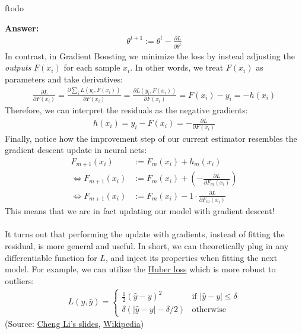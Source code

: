 ƒtodo\documentclass{article}
\newenvironment{QandA}{\begin{enumerate}[label=\arabic*.]}{\end{enumerate}}
\newenvironment{InnerQandA}{\begin{enumerate}[label=\roman*.]}{\end{enumerate}}
\newenvironment{answer}{\par\normalfont \textbf{Answer:}}{}
\begin{document}
\begin{QandA}
\begin{InnerQandA}
\begin{answer}
            \begin{align*}
                \theta^{t+1} := \theta^t - \frac{\partial L}{\partial \theta^t}
            \end{align*}
            In contrast, in Gradient Boosting we minimize the loss by instead adjusting the \textit{outputs} $F(x_i)$ for each sample $x_i$. In other words, we treat $F(x_i)$ as parameters and take derivatives:
            \begin{align*}
                \frac{\partial L}{\partial F(x_i)} = \frac{\partial \sum_i L(y_i, F(x_i))}{\partial F(x_i)} = \frac{\partial L(y_i, F(x_i))}{\partial F(x_i)} = F(x_i) - y_i = - h(x_i)
            \end{align*}
            Therefore, we can interpret the residuals as the negative gradients:
            \begin{align*}
                h(x_i) = y_i - F(x_i) = - \frac{\partial L}{\partial F(x_i)}
            \end{align*}
            Finally, notice how the improvement step of our current estimator resembles the gradient descent update in neural nets:
            \begin{align*}
                F_{m+1}(x_i) &:= F_m(x_i) + h_m(x_i) \\
                \Leftrightarrow F_{m+1}(x_i) &:= F_m(x_i) + (-\frac{\partial L}{\partial F_m(x_i)}) \\
                \Leftrightarrow F_{m+1}(x_i) &:= F_m(x_i) 
                - 1 \cdot \frac{\partial L}{\partial F_m(x_i)}
            \end{align*}
            This means that we are in fact updating our model with gradient descent! \\\\
            It turns out that performing the update with gradients, instead of fitting the residual, is more general and useful. In short, we can theoretically plug in any differentiable function for $L$, and inject its properties when fitting the next model. For example, we can utilize the \href{https://en.wikipedia.org/wiki/Huber_loss}{Huber loss} which is more robust to outliers:
            \begin{align*}
                L(y, \hat{y}) = \begin{cases}
                    \frac{1}{2}(\hat{y} - y)^2 &\text{if } \vert \hat{y} - y \vert \le \delta \\
                    \delta(\vert \hat{y} - y \vert - \delta/2) &\text{otherwise}
                \end{cases}
            \end{align*}
            (Source: \href{http://www.chengli.io/tutorials/gradient_boosting.pdf}{Cheng Li's slides}, \href{https://en.wikipedia.org/wiki/Gradient_boosting}{Wikipedia})
            

\end{answer}
\end{InnerQandA}
\end{QandA}
\end{document}
